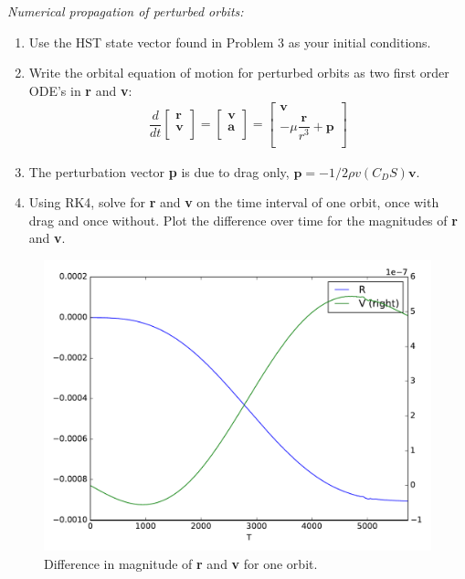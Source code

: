 \documentclass[onecolumn,10pt]{jhwhw}
\begin{document}
\clearpage
\problem{}
\textit{Numerical propagation of perturbed orbits:}
\begin{enumerate}
\item Use the HST state vector found in Problem 3 as your initial conditions.
\item Write the orbital equation of motion for perturbed orbits as two first order ODE’s in \textbf{r} and \textbf{v}:
\begin{align*}
\dfrac{d}{dt} \begin{bmatrix}
          \textbf{r} \\
          \textbf{v} \\
        \end{bmatrix}
  = \begin{bmatrix}
          \textbf{v} \\
          \textbf{a} \\
        \end{bmatrix}
  = \begin{bmatrix}
          \textbf{v} \\
          -\mu \dfrac{\textbf{r}}{r^3} + \textbf{p} \\
        \end{bmatrix}
\end{align*}
\item The perturbation vector \textbf{p} is due to drag only, $\textbf{p} = -1/2 \rho v(C_D S)\textbf{v}$.
\item Using RK4, solve for \textbf{r} and \textbf{v} on the time interval of one orbit, once with drag and once without. Plot the
difference over time for the magnitudes of \textbf{r} and \textbf{v}.
\end{enumerate}

\begin{figure}[tbh!]
\begin{center}
\includegraphics[height=0.4\textheight]{p7.pdf}
\end{center}
\caption{Difference in magnitude of \textbf{r} and \textbf{v} for one orbit.}
\end{figure}

% 

% 
\end{document}
